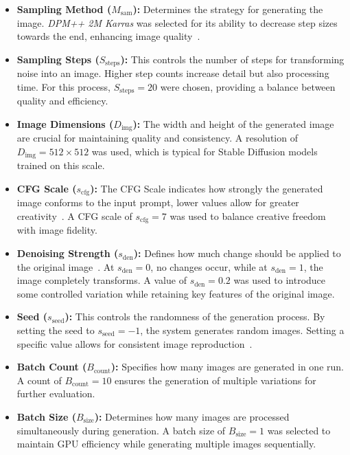 \documentclass[12pt,DIV14,BCOR12mm,a4paper,footinclude=false,headinclude,parskip=half-,twoside,openright,cleardoublepage=empty,toc=index,bibliography=totoc,listof=totoc]{scrreprt}
\numberwithin{equation}{chapter}
\begin{document}
\begin{itemize}
    \item \textbf{Sampling Method (\(M_{\text{sam}}\)):} Determines the strategy for generating the image. \textit{DPM++ 2M Karras} was selected for its ability to decrease step sizes towards the end, enhancing image quality~\cite{lu2022dpm}.
    
    \item \textbf{Sampling Steps (\(S_{\text{steps}}\)):} This controls the number of steps for transforming noise into an image. Higher step counts increase detail but also processing time. For this process, \(S_{\text{steps}} = 20\) were chosen, providing a balance between quality and efficiency.
    
    \item \textbf{Image Dimensions (\(D_{\text{img}}\)):} The width and height of the generated image are crucial for maintaining quality and consistency. A resolution of \(D_{\text{img}} = 512 \times 512\) was used, which is typical for Stable Diffusion models trained on this scale.
    
    \item \textbf{CFG Scale (\(s_{\text{cfg}}\)):} The CFG Scale indicates how strongly the generated image conforms to the input prompt, lower values allow for greater creativity~\cite{nextdiffusion}. A CFG scale of \(s_{\text{cfg}} = 7\) was used to balance creative freedom with image fidelity.
    
    \item \textbf{Denoising Strength (\(s_{\text{den}}\)):} Defines how much change should be applied to the original image~\cite{nextdiffusion}. At \(s_{\text{den}} = 0\), no changes occur, while at \(s_{\text{den}} = 1\), the image completely transforms. A value of \(s_{\text{den}} = 0.2\) was used to introduce some controlled variation while retaining key features of the original image.
    
    \item \textbf{Seed (\(s_{\text{seed}}\)):} This controls the randomness of the generation process. By setting the seed to \(s_{\text{seed}} = -1\), the system generates random images. Setting a specific value allows for consistent image reproduction~\cite{nextdiffusion}.
    
    \item \textbf{Batch Count (\(B_{\text{count}}\)):} Specifies how many images are generated in one run. A count of \(B_{\text{count}} = 10\) ensures the generation of multiple variations for further evaluation.
    
    \item \textbf{Batch Size (\(B_{\text{size}}\)):} Determines how many images are processed simultaneously during generation. A batch size of \(B_{\text{size}} = 1\) was selected to maintain GPU efficiency while generating multiple images sequentially.
\end{itemize}
\end{document}

